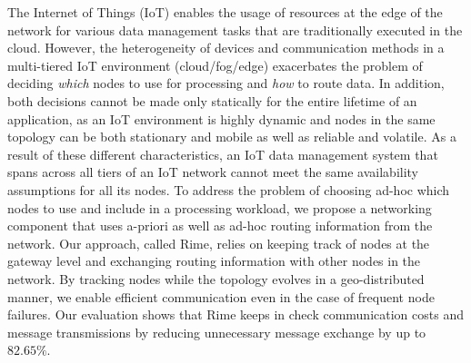 The Internet of Things (IoT) enables the usage of resources at the
edge of the network for various data management tasks that are traditionally executed in the cloud.
However, the heterogeneity of devices and communication methods in a multi-tiered
IoT environment (cloud/fog/edge) exacerbates the problem of deciding \textit{which} nodes to use for processing and \textit{how} to route  data.
% 
In addition, both decisions cannot be made only statically for the entire lifetime of an application, as an IoT environment is highly dynamic and nodes in the same topology can be both stationary and mobile as well as reliable and volatile.
%
As a result of these different characteristics, an IoT data management system that spans across all tiers of an IoT network cannot meet the same availability assumptions for all its nodes.
% 
To address the problem of choosing ad-hoc which nodes to use and include in a processing workload, 
we propose a networking component that uses a-priori as well as ad-hoc routing 
information from the network. 
Our approach, called Rime, relies on keeping track of nodes at the gateway level 
and exchanging routing information with other nodes in the network.
% 
By tracking nodes while the topology evolves in a geo-distributed 
manner, we enable efficient communication even in the case of frequent node failures.
Our evaluation shows that Rime keeps in check communication costs and message transmissions 
by reducing unnecessary message exchange by up to $82.65\%$.

